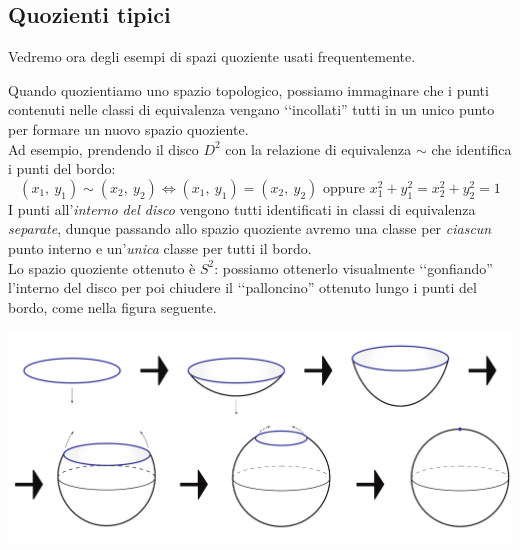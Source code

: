 	\subsection{Quozienti tipici}
Vedremo ora degli esempi di spazi quoziente usati frequentemente.
\begin{intuit}
	Quando quozientiamo uno spazio topologico, possiamo immaginare che i punti contenuti nelle classi di equivalenza vengano ‘‘incollati'' tutti in un unico punto per formare un nuovo spazio quoziente.\\
	Ad esempio, prendendo il disco $D^2$ con la relazione di equivalenza $\sim$ che identifica i punti del bordo:
	\begin{equation*}
		(x_1,\ y_1) \sim (x_2,\ y_2)\iff (x_1,\ y_1)=(x_2,\ y_2) \text{ oppure } x_1^2 +y_1^2= x_2^2 +y_2^2=1
	\end{equation*}
	I punti all'\textit{interno del disco} vengono tutti identificati in classi di equivalenza \textit{separate}, dunque passando allo spazio quoziente avremo una classe per \textit{ciascun} punto interno e un'\textit{unica} classe per tutti il bordo.\\
	Lo spazio quoziente ottenuto è $S^2$: possiamo ottenerlo visualmente ‘‘gonfiando'' l'interno del disco per poi chiudere il ‘‘palloncino'' ottenuto lungo i punti del bordo, come nella figura seguente.
	\begin{center}
		\includegraphics[trim=0cm 0cm 0cm 0cm,clip,scale=0.4]{images/disctosphere.pdf}
	\end{center}
\end{intuit}
